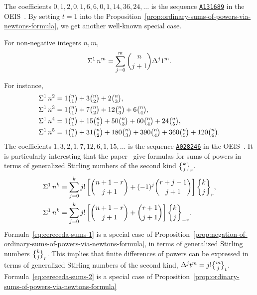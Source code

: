 The coefficients $0,1,2,0, 1, 6, 6, 0, 1, 14, 36, 24, \dots$ is the sequence
\href{https://oeis.org/A131689}{\texttt{A131689}}
in the OEIS~\cite{sloane2003line}.
By setting $t=1$ into
the
Proposition~\eqref{prop:ordinary-sums-of-powers-via-newtons-formula}, we get
another well-known special case.
\begin{corollary}
  For non-negative integers $n,m$,
  \begin{align*}
    \Sigma^{1}\,{n}^{m} = \sum_{j=0}^{m} \binom{n}{j+1} \Delta^{j} 1^m.
  \end{align*}
\end{corollary}
For instance,
\begin{align*}
  \Sigma^{1}\,{n}^{2} &= 1 \tbinom{n}{1} + 3 \tbinom{n}{2}
  +2   \tbinom{n}{3},
  \\
  \Sigma^{1}\,{n}^{3} &= 1 \tbinom{n}{1} + 7 \tbinom{n}{2}
  +12  \tbinom{n}{3} + 6  \tbinom{n}{4},
  \\
  \Sigma^{1}\,{n}^{4} &= 1 \tbinom{n}{1} +15 \tbinom{n}{2}
  +50  \tbinom{n}{3} +60  \tbinom{n}{4} + 24 \tbinom{n}{5},
  \\
  \Sigma^{1}\,{n}^{5} &= 1 \tbinom{n}{1} +31 \tbinom{n}{2}
  +180 \tbinom{n}{3} +390 \tbinom{n}{4} + 360 \tbinom{n}{5}
  + 120 \tbinom{n}{6}.
\end{align*}
The coefficients $1,3,2,1,7,12,6,1,15, \dots$ is the sequence
\href{https://oeis.org/A028246}{\texttt{A028246}}
in the OEIS~\cite{sloane2003line}.
It is particularly interesting that the paper~\cite{cereceda2022sums}
give formulas for sums of powers
in terms of generalized Stirling numbers of
the second kind $\stirlingii{k}{j}_{r}$.
\begin{align}
  \KnuthRFoldSum{1}{n}{k} &= \sum_{j=0}^{k} j!
  \left[
    \binom{n+1-r}{j+1} + (-1)^j \binom{r+j-1}{j+1}
  \right] \stirlingii{k}{j}_{r},
  \label{eq:cereceda-sums-1}
  \\
  \KnuthRFoldSum{1}{n}{k} &= \sum_{j=0}^{k} j!
  \left[
    \binom{n+1-r}{j+1} + \binom{r+1}{j+1}
  \right] \stirlingii{k}{j}_{-r}.
  \label{eq:cereceda-sums-2}
\end{align}
Formula~\eqref{eq:cereceda-sums-1}
is a special case of
Proposition~\eqref{prop:negation-of-ordinary-sums-of-powers-via-newtons-formula},
in terms of generalized Stirling numbers $\stirlingii{k}{j}_{r}$.
This implies that finite differences of powers can be expressed
in terms of generalized Stirling numbers of the second kind,
$\Delta^{j} t^m = j! \stirlingii{m}{j}_{t}$.
Formula~\eqref{eq:cereceda-sums-2} is a special case
of Proposition~\eqref{prop:ordinary-sums-of-powers-via-newtons-formula}
